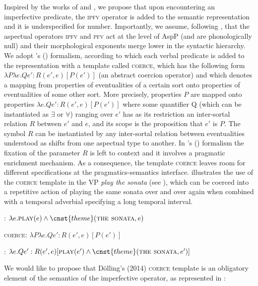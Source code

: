 \documentclass[output=paper]{langscibook}
\begin{document}
Inspired by the works of \citet{Dolling2014} and \citet{Egg2005}, we propose that upon encountering an imperfective predicate, the \textsc{ipfv} operator is added to the semantic representation and it is underspecified for number. Importantly, we assume, following \citet{Tatevosov2011, Tatevosov2015}, that the aspectual operators \textsc{ipfv} and \textsc{pfv} act at the level of AspP (and are phonologically null) and their morphological exponents merge lower in the syntactic hierarchy. We adopt \citeauthor{Dolling2014}'s (\citeyear[34--35]{Dolling2014}) formalism, according to which each verbal predicate is added to the representation with a template called \textsc{coerce}, which has the following form $\lambda P \lambda e. Qe': R(e', e) [P(e')]$ (an abstract coercion operator) and which denotes a mapping from properties of eventualities of a certain sort onto properties of eventualities of some other sort. More precisely, properties $P$ are mapped onto properties $\lambda e. Qe': R(e', e) [P(e')]$ where some quantifier Q (which can be instantiated as $\exists$ or $\forall$) ranging over $e'$ has as its restriction an inter-sortal relation $R$ between $e'$ and $e$, and its scope is the proposition that $e'$ is $P$. The symbol $R$ can be instantiated by any inter-sortal relation between eventualities understood as shifts from one aspectual type to another. In \citeauthor{Dolling2014}'s (\citeyear[34--35]{Dolling2014}) formalism the fixation of the parameter $R$ is left to context and it involves a pragmatic enrichment mechanism. As a consequence, the template \textsc{coerce} leaves room for different specifications at the pragmatics-semantics interface. \citet[34--35]{Dolling2014} illustrates the use of the \textsc{coerce} template in the VP \textit{play the sonata} (see ), which can be coerced into a repetitive action of playing the same sonata over and over again when combined with a temporal adverbial specifying a long temporal interval.

\ea {}: $\lambda e. \textsc{play}(e) \wedge \cnst{theme}(\textsc{the sonata}, e)$\label{jan-bla:fansb:kb:ex27}
\z

\ea \textsc{coerce}: 
$\lambda P \lambda e.Qe': R(e', e) [P(e')]$\label{jan-bla:fansb:kb:ex28}
\z

\ea {}: $\lambda e.Qe': R(e',e) [\textsc{play}(e') \wedge \cnst{theme}(\textsc{the sonata}, e')]$\label{jan-bla:fansb:kb:ex29}
\z

\noindent We would like to propose that Dölling’s (2014) \textsc{coerce} template is an obligatory element of the semantics of the imperfective operator, as represented in :
\end{document}
